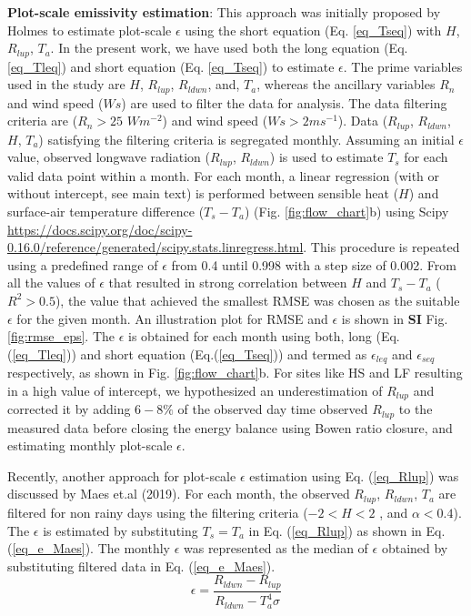 \documentclass[fleqn,10pt]{wlscirep}
\begin{document}
{{\textbf{Plot-scale emissivity estimation}:
This approach was initially proposed by Holmes\cite{holmes2009land} to estimate plot-scale $\epsilon$ using the short equation (Eq. \ref{eq_Tseq}) with $H$, $R_{lup}$, $T_{a}$. In the present work, we have used both the long equation (Eq. \ref{eq_Tleq}) and short equation (Eq. \ref{eq_Tseq}) to estimate $\epsilon$.
The prime variables used in the study are $H$, $R_{lup}$, $R_{ldwn}$, and, $T_{a}$, whereas the ancillary variables $R_{n}$ and wind speed ($Ws$) are used to filter the data for analysis. The data filtering criteria are ($R_{n} > 25$ $Wm^{-2}$) and wind speed ($Ws > 2ms^{-1}$)\cite{holmes2009land}. Data ($R_{lup}$, $R_{ldwn}$, $H$, $T_{a}$) satisfying the filtering criteria is segregated monthly. Assuming an initial $\epsilon$ value, observed longwave radiation ($R_{lup}$, $R_{ldwn}$) is used to estimate $T_{s}$ for each valid data point within a month. For each month, a linear regression (with or without intercept, see main text) is performed between sensible heat ($H$) and surface-air temperature difference ($T_{s}-T_{a}$) (Fig. \ref{fig:flow_chart}b) using Scipy \url{https://docs.scipy.org/doc/scipy-0.16.0/reference/generated/scipy.stats.linregress.html}. 
This procedure is repeated using a predefined range of $\epsilon$ from 0.4 until 0.998 with a step size of 0.002.
From all the values of $\epsilon$ that resulted in strong correlation between $H$ and $T_{s}-T_{a}$ ($R^{2}>0.5$), the value that achieved the smallest RMSE was chosen as the suitable $\epsilon$ for the given month. An illustration plot for RMSE and $\epsilon$ is shown in \textbf{SI} Fig. \ref{fig:rmse_eps}. The $\epsilon$ is obtained for each month using both, long (Eq. (\ref{eq_Tleq})) and short equation (Eq.(\ref{eq_Tseq})) and termed as $\epsilon_{leq}$ and $\epsilon_{seq}$ respectively, as shown in Fig. \ref{fig:flow_chart}b. 
For sites like HS and LF resulting in a high value of intercept, we hypothesized an underestimation of $R_{lup}$ and corrected it by adding $6-8\%$ of the observed day time observed $R_{lup}$ to the measured data before closing the energy balance using Bowen ratio closure, and estimating monthly plot-scale $\epsilon$. 

Recently, another approach for plot-scale $\epsilon$ estimation using Eq. (\ref{eq_Rlup}) was discussed by Maes et.al (2019)\cite{maes2019potential}. For each month, the observed $R_{lup}$,  $R_{ldwn}$, $T_{a}$  are filtered for non rainy days using the filtering criteria ($-2 < H <2$ , and $\alpha < 0.4$). The $\epsilon$ is estimated by substituting $T_{s} = T_{a}$ in Eq. (\ref{eq_Rlup}) as shown in Eq. (\ref{eq_e_Maes}). The monthly $\epsilon$  was represented as the median of $\epsilon$ obtained by substituting filtered data in Eq. (\ref{eq_e_Maes}). 
\begin{equation}\label{eq_e_Maes}
\epsilon = \frac{R_{ldwn} - R_{lup}}{R_{ldwn} - T_{a}^{4} \sigma}
\end{equation}


}}
\end{document}
